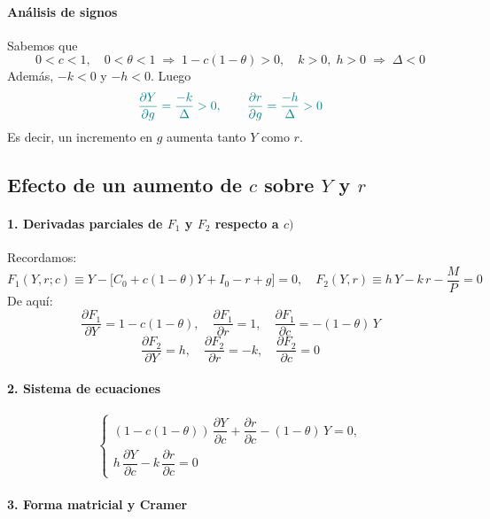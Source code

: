 \documentclass{article}
\begin{document}
\paragraph{Análisis de signos}

Sabemos que
\[
0 < c < 1,\quad 0 < \theta < 1
\;\Longrightarrow\;
1 - c(1-\theta)>0,
\quad k>0,\;h>0
\;\Longrightarrow\;
\Delta<0
\]
Además,
\(-k<0\) y \(-h<0\). Luego
\[
\color{teal}
\frac{\partial Y}{\partial g}
=\frac{-k}{\Delta}
>0,
\qquad
\frac{\partial r}{\partial g}
=\frac{-h}{\Delta}
>0
\]
Es decir, un incremento en \(g\) aumenta tanto \(Y\) como \(r\).

\subsection*{Efecto de un aumento de \(c\) sobre \(Y\) y \(r\)}

\paragraph{1. Derivadas parciales de \(F_1\) y \(F_2\) respecto a \(c)\)}  
Recordamos:
\[
F_1(Y,r;c)\equiv Y - \bigl[C_0 + c(1-\theta)Y + I_0 - r + g\bigr]=0,
\quad
F_2(Y,r)\equiv h\,Y - k\,r - \frac{M}{P}=0
\]
De aquí:
\[
\frac{\partial F_1}{\partial Y}=1 - c(1-\theta),\quad
\frac{\partial F_1}{\partial r}=1,\quad
\frac{\partial F_1}{\partial c}= -(1-\theta)\,Y
\]
\[
\frac{\partial F_2}{\partial Y}=h,\quad
\frac{\partial F_2}{\partial r}=-k,\quad
\frac{\partial F_2}{\partial c}=0
\]

\paragraph{2. Sistema de ecuaciones}  

\[
\begin{cases}
(1 - c(1-\theta))\,\dfrac{\partial Y}{\partial c}
+ \dfrac{\partial r}{\partial c}
- (1-\theta)\,Y = 0,\\[6pt]
h\,\dfrac{\partial Y}{\partial c}
- k\,\dfrac{\partial r}{\partial c}
= 0
\end{cases}
\]

\paragraph{3. Forma matricial y Cramer}  
\end{document}

